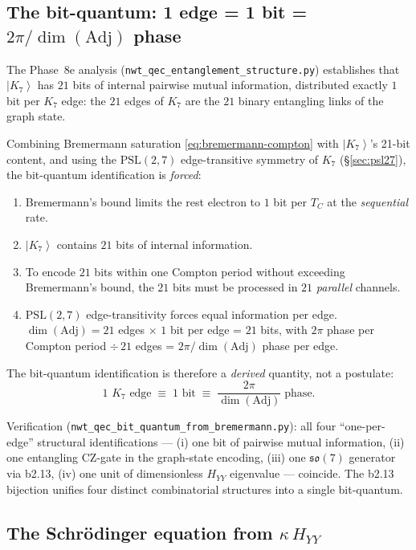 \documentclass[11pt]{article}
\newcommand{\so}{\mathfrak{so}}
\newcommand{\Adj}{\mathrm{Adj}}
\newcommand{\ket}[1]{\left|#1\right\rangle}
\newcommand{\PSL}{\mathrm{PSL}}
\begin{document}
\subsection{The bit-quantum: 1 edge = 1 bit = $2\pi/\dim(\Adj)$ phase}
\label{sec:bit-quantum}

The Phase~8e analysis (\texttt{nwt\_qec\_entanglement\_structure.py})
establishes that $\ket{K_7}$ has $21$ bits of internal pairwise
mutual information, distributed exactly $1$ bit per $K_7$ edge:
the $21$ edges of $K_7$ are the $21$ binary entangling links of the
graph state.

Combining Bremermann saturation
\eqref{eq:bremermann-compton} with $\ket{K_7}$'s 21-bit content,
and using the $\PSL(2,7)$ edge-transitive symmetry of $K_7$
(\S\ref{sec:psl27}), the bit-quantum identification is
\emph{forced}:
\begin{enumerate}
\item Bremermann's bound limits the rest electron to $1$ bit per
  $T_C$ at the \emph{sequential} rate.
\item $\ket{K_7}$ contains $21$ bits of internal information.
\item To encode $21$ bits within one Compton period without
  exceeding Bremermann's bound, the $21$ bits must be processed in
  $21$ \emph{parallel} channels.
\item $\PSL(2,7)$ edge-transitivity forces equal information
  per edge.  $\dim(\Adj) = 21$ edges $\times$ $1$ bit per edge =
  $21$ bits, with $2\pi$ phase per Compton period $\div\, 21$
  edges = $2\pi/\dim(\Adj)$ phase per edge.
\end{enumerate}

\noindent
The bit-quantum identification is therefore a \emph{derived} quantity, not
a postulate:
\begin{equation}
  \boxed{\quad
    \text{1 $K_7$ edge}
    \;\equiv\;
    \text{1 bit}
    \;\equiv\;
    \frac{2\pi}{\dim(\Adj)}\;\text{phase}.
  \quad}
  \label{eq:bit-quantum}
\end{equation}

Verification (\texttt{nwt\_qec\_bit\_quantum\_from\_bremermann.py}):
all four ``one-per-edge'' structural identifications --- (i) one bit
of pairwise mutual information, (ii) one entangling CZ-gate in the
graph-state encoding, (iii) one $\so(7)$ generator via b2.13, (iv)
one unit of dimensionless $H_{YY}$ eigenvalue --- coincide.  The
b2.13 bijection unifies four distinct combinatorial structures
into a single bit-quantum.

\subsection{The Schr\"odinger equation from $\kappa\, H_{YY}$}
\label{sec:schrodinger-derivation}
\end{document}

